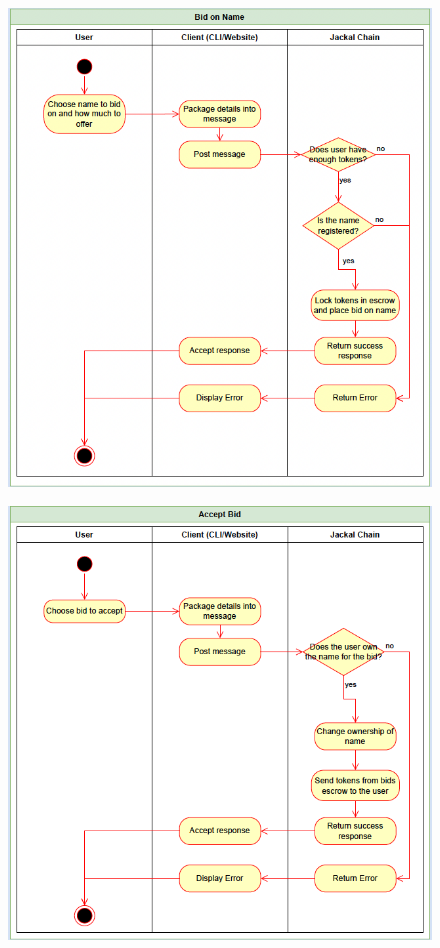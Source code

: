 \documentclass[a4paper]{article}
\begin{document}
\begin{figure}[!htbp]
\centering
\includegraphics[width=1\textwidth]{assets/rns5.png}
\caption{}
\end{figure}

\begin{figure}[!htbp]
\centering
\includegraphics[width=1\textwidth]{assets/rns6.png}
\caption{}
\end{figure}
\end{document}
